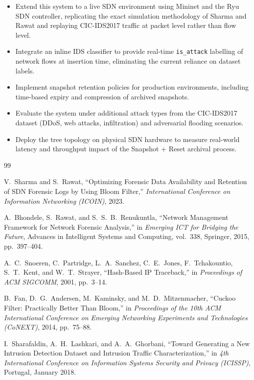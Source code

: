 \documentclass[12pt, a4paper]{report}
\begin{document}
\begin{itemize}[leftmargin=*]
  \item Extend this system to a live SDN environment using Mininet and
  the Ryu SDN controller, replicating the exact simulation methodology
  of Sharma and Rawat \cite{sharma2023} and replaying CIC-IDS2017 traffic
  at packet level rather than flow level.

  \item Integrate an inline IDS classifier to provide real-time
  \texttt{is\_attack} labelling of network flows at insertion time,
  eliminating the current reliance on dataset labels.

  \item Implement snapshot retention policies for production
  environments, including time-based expiry and compression of archived
  snapshots.

  \item Evaluate the system under additional attack types from the
  CIC-IDS2017 dataset (DDoS, web attacks, infiltration) and adversarial
  flooding scenarios.

  \item Deploy the tree topology on physical SDN hardware to measure
  real-world latency and throughput impact of the Snapshot + Reset
  archival process.
\end{itemize}

\newpage
\begin{thebibliography}{99}

V.~Sharma and S.~Rawat,
``Optimizing Forensic Data Availability and Retention of SDN Forensic
Logs by Using Bloom Filter,''
\textit{International Conference on Information Networking (ICOIN)},
2023.

A.~Bhondele, S.~Rawat, and S.~S.~B.~Renukuntla,
``Network Management Framework for Network Forensic Analysis,''
in \textit{Emerging ICT for Bridging the Future},
Advances in Intelligent Systems and Computing, vol.~338,
Springer, 2015, pp.~397--404.

A.~C.~Snoeren, C.~Partridge, L.~A.~Sanchez, C.~E.~Jones, F.~Tchakountio,
S.~T.~Kent, and W.~T.~Strayer,
``Hash-Based IP Traceback,''
in \textit{Proceedings of ACM SIGCOMM},
2001, pp.~3--14.

B.~Fan, D.~G.~Andersen, M.~Kaminsky, and M.~D.~Mitzenmacher,
``Cuckoo Filter: Practically Better Than Bloom,''
in \textit{Proceedings of the 10th ACM International Conference on
Emerging Networking Experiments and Technologies (CoNEXT)},
2014, pp.~75--88.

I.~Sharafaldin, A.~H.~Lashkari, and A.~A.~Ghorbani,
``Toward Generating a New Intrusion Detection Dataset and Intrusion
Traffic Characterization,''
in \textit{4th International Conference on Information Systems
Security and Privacy (ICISSP)},
Portugal, January 2018.

\end{thebibliography}
\end{document}
